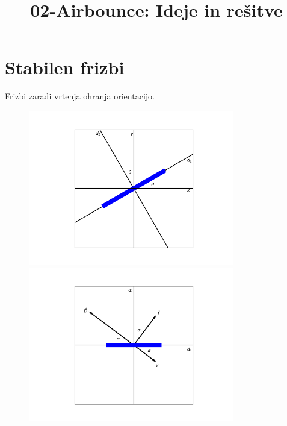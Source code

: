 \documentclass[11pt,a4paper]{article}
\title{02-Airbounce: Ideje in rešitve}
\date{}
\begin{document}
\maketitle

\section{Stabilen frizbi}
Frizbi zaradi vrtenja ohranja orientacijo.

\begin{figure}[H]
	\centering
	\begin{minipage}{.5\textwidth}
	  \centering
	  \includegraphics[width=9cm]{graf_osi.png}
	\end{minipage}%
	\begin{minipage}{.5\textwidth}
	  \centering
	  \includegraphics[width=9cm]{osi_frisbeeja.png}
	\end{minipage}
	\end{figure}
\end{document}

